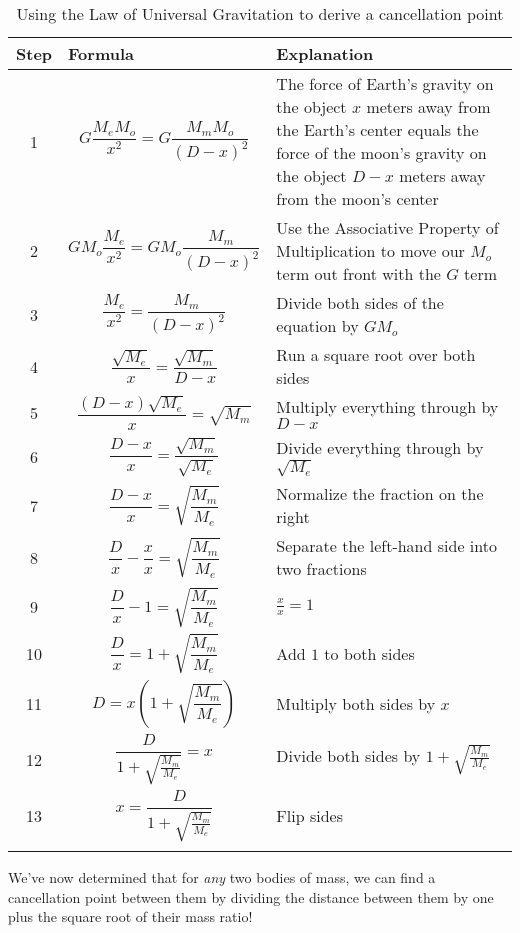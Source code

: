 \documentclass[12pt,letterpaper]{article}
\begin{document}
\begin{longtable}{| c | p{} | p{} |}
  \hline
  Step & Formula & Explanation \\
  \hline
  1 & \[ G\frac{M_e M_o}{x^2} = G\frac{M_m M_o}{(D - x)^2} \] & The
    force of Earth's gravity on the object $x$ meters away from the
    Earth's center equals the force of the moon's gravity on the
    object $D - x$ meters away from the moon's center\\
    \hline
  2 & \[ GM_o \frac{M_e}{x^2} = GM_o\frac{M_m}{(D - x)^2} \] & Use the
  Associative Property of Multiplication to move our $M_o$ term out
  front with the $G$ term \\
  \hline
  3 & \[ \frac{M_e}{x^2} = \frac{M_m}{(D - x)^2} \] & Divide both
  sides of the equation by $GM_o$ \\
  \hline
  4 & \[ \frac{\sqrt{M_e}}{x} = \frac{\sqrt{M_m}}{D - x} \] & Run a
  square root over both sides \\
  \hline
  5 & \[ \frac{(D-x)\sqrt{M_e}}{x} = \sqrt{M_m} \] & Multiply
  everything through by $D - x$ \\
  \hline
  6 & \[ \frac{D-x}{x} = \frac{\sqrt{M_m}}{\sqrt{M_e}} \] & Divide
  everything through by $\sqrt{M_e}$ \\
  \hline
  7 & \[ \frac{D - x}{x} = \sqrt{\frac{M_m}{M_e}} \] & Normalize the
  fraction on the right \\
  \hline
  8 & \[ \frac{D}{x} - \frac{x}{x} = \sqrt{\frac{M_m}{M_e}} \] &
  Separate the left-hand side into two fractions \\
  \hline
  9 & \[ \frac{D}{x} - 1 = \sqrt{\frac{M_m}{M_e}} \] & $\frac{x}{x} =
  1$ \\
  \hline
  10 & \[ \frac{D}{x} = 1 + \sqrt{\frac{M_m}{M_e}} \] & Add $1$ to
  both sides \\
  \hline
  11 & \[ D = x\left( 1 + \sqrt{\frac{M_m}{M_e}}\right) \] & Multiply both sides by
  $x$ \\
  \hline
  12 & \[ \frac{D}{1 + \sqrt{\frac{M_m}{M_e}}} = x \] & Divide both
  sides by $1 + \sqrt{\frac{M_m}{M_e}}$\\
  \hline
  13 & \[ x = \frac{D}{1 + \sqrt{\frac{M_m}{M_e}}} \] & Flip sides \\
  \hline
\caption{Using the Law of Universal Gravitation to derive a cancellation
  point}
\end{longtable}

We've now determined that for \textit{any} two bodies of mass, we
can find a cancellation point between them by dividing the distance
between them by one plus the square root of their mass ratio!
\end{document}
